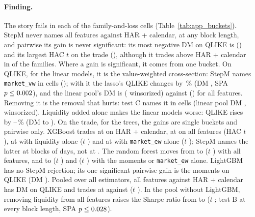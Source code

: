 \paragraph{Finding.} The story fails in each of the \bkCells{} family-and-loss cells
(Table~\ref{tab:app_buckets}). StepM never names all features against HAR + calendar, at any
block length, and pairwise its gain is never significant: its most negative DM on QLIKE is
\bkAllDMMin{} (\bkAllDMMinWho) and its largest HAC $t$ on the trade \bkAllTMax{}
(\bkAllTMaxWho), although it trades above HAR + calendar in \bkAllShHigher{} of the
\bkNFam{} families. Where a gain is significant, it comes from one bucket. On QLIKE, for the
linear models, it is the value-weighted cross-section: StepM names \texttt{market\_vw} in
\bkBucketCells{} cells (\bkBucketCellsWho); with it the lasso's QLIKE changes by
\bkLassoVwDQ\,\% (DM \bkLassoVwDM, SPA $p\le0.002$), and the linear pool's DM is
\bkPoolLinVwDM{} (\bkPoolLinVwDMw{} winsorized) against \bkPoolLinAllDM{}
(\bkPoolLinAllDMw) for all features. Removing it is the removal that hurts: test C names it
in \bkRemoveCells{} cells (linear pool DM \bkPoolLinVwOutDM, \bkPoolLinVwOutDMw{}
winsorized). Liquidity added alone makes the linear models worse: QLIKE rises by
\bkLiqLinDQMin--\bkLiqLinDQMax\,\% (DM \bkLiqLinDMMin{} to \bkLiqLinDMMax). On the trade, for
the trees, the gains are single buckets and pairwise only. XGBoost trades at \bkXgbBaseSh{}
on HAR + calendar, at \bkXgbAllSh{} on all features (HAC $t$ \bkXgbAllT), at \bkXgbLiqSh{}
with liquidity alone ($t$ \bkXgbLiqT) and at \bkXgbMewSh{} with \texttt{market\_ew} alone
($t$ \bkXgbMewT); StepM names the latter at blocks of \bkXgbMewStepmBlocks{} days, not at
\bkXgbMewStepmMiss. The random forest moves from \bkRfBaseSh{} to \bkRfAllSh{} ($t$
\bkRfAllT) with all features, and to \bkRfMomSh{} ($t$ \bkRfMomT) and \bkRfMewSh{} ($t$
\bkRfMewT) with the moments or \texttt{market\_ew} alone. LightGBM has no StepM rejection;
its one significant pairwise gain is the moments on QLIKE (DM \bkLgbmMomDM). Pooled over all
\bkNEst{} estimators, all features against HAR + calendar has DM \bkPoolAllDM{} on QLIKE and
trades at \bkPoolAllSh{} against \bkPoolAllBaseSh{} ($t$ \bkPoolAllT). In the pool without
LightGBM, removing liquidity from all features raises the Sharpe ratio from
\bkPoolFiveAllSh{} to \bkPoolFiveLiqOutSh{} ($t$ \bkPoolFiveLiqOutT; test B at every block
length, SPA $p\le0.028$).

